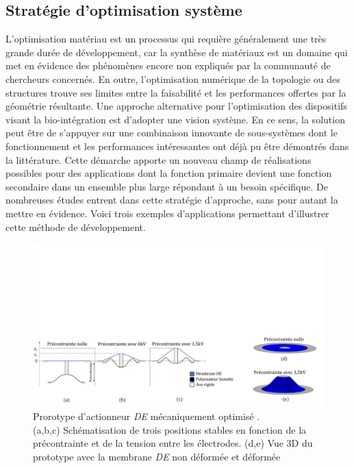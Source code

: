 	\subsection{Stratégie d'optimisation système}
	\label{subsec:1.2.3_Strategie systeme}
L'optimisation matériau est un processus qui requière généralement une très grande durée de développement, car la synthèse de matériaux est un domaine qui met en évidence des phénomènes encore non expliqués par la communauté de chercheurs concernés. En outre, l'optimisation numérique de la topologie ou des structures trouve ses limites entre la faisabilité et les performances offertes par la géométrie résultante. Une approche alternative pour l'optimisation des dispositifs visant la bio-intégration est d'adopter une vision système. En ce sens, la solution peut être de s'appuyer sur une combinaison innovante de sous-systèmes dont le fonctionnement et les performances intéressantes ont déjà pu être démontrés dans la littérature. Cette démarche apporte un nouveau champ de réalisations possibles pour des applications dont la fonction primaire devient une fonction secondaire dans un ensemble plus large répondant à un besoin spécifique. De nombreuses études entrent dans cette stratégie d'approche, sans pour autant la mettre en évidence. Voici trois exemples d'applications permettant d'illustrer cette méthode de développement.
\begin{figure}[!htbp] 
\centering
\captionsetup{justification=centering}
\includegraphics[trim={0cm 0cm 0cm 10cm},clip, width=\textwidth]{../Chap1/Figure/DEA.pdf}
\caption{Prorotype d'actionneur \emph{DE} mécaniquement optimisé \cite{Croce2021}.\\
		 (a,b,c) Schématisation de trois positions stables en fonction de la précontrainte et de la tension entre les électrodes. (d,e) Vue 3D du prototype avec la membrane \emph{DE} non déformée et déformée}
\label{fig:DEA}
\end{figure}

